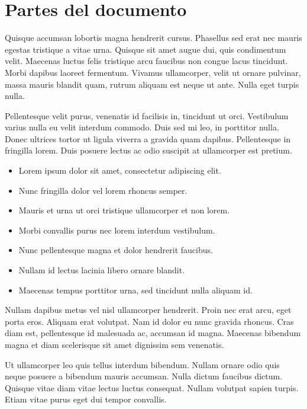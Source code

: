 \documentclass[12pt,a4paper]{report}
\begin{document}
\section{Partes del documento}
\label{seccion.partes}



Quisque accumsan lobortis magna hendrerit cursus. Phasellus sed erat nec mauris egestas tristique a vitae urna. Quisque sit amet augue dui, quis condimentum velit. Maecenas luctus felis tristique arcu faucibus non congue lacus tincidunt. Morbi dapibus laoreet fermentum. Vivamus ullamcorper, velit ut ornare pulvinar, massa mauris blandit quam, rutrum aliquam est neque ut ante. Nulla eget turpis nulla. 

Pellentesque velit purus, venenatis id facilisis in, tincidunt ut orci. Vestibulum varius nulla eu velit interdum commodo. Duis sed mi leo, in porttitor nulla. Donec ultrices tortor ut ligula viverra a gravida quam dapibus. Pellentesque in fringilla lorem. Duis posuere lectus ac odio suscipit at ullamcorper est pretium.



\begin{itemize}
\renewcommand{\labelitemi}{$\triangleright$}
%
\item
Lorem ipsum dolor sit amet, consectetur adipiscing elit.
\item
Nunc fringilla dolor vel lorem rhoncus semper.
\item
Mauris et urna ut orci tristique ullamcorper et non lorem.
\item
Morbi convallis purus nec lorem interdum vestibulum.
\item
Nunc pellentesque magna et dolor hendrerit faucibus.
\item
Nullam id lectus lacinia libero ornare blandit.
\item
Maecenas tempus porttitor urna, sed tincidunt nulla aliquam id.
%
\end{itemize}



Nullam dapibus metus vel nisl ullamcorper hendrerit. Proin nec erat arcu, eget porta eros. Aliquam erat volutpat. Nam id dolor eu nunc gravida rhoncus. Cras diam est, pellentesque id malesuada ac, accumsan id magna. Maecenas bibendum magna et diam scelerisque sit amet dignissim sem venenatis. 

Ut ullamcorper leo quis tellus interdum bibendum. Nullam ornare odio quis neque posuere a bibendum mauris accumsan. Nulla dictum faucibus dictum. Quisque vitae diam vitae lectus luctus consequat. Nullam volutpat sapien turpis. Etiam vitae purus eget dui tempor convallis. 
\end{document}
